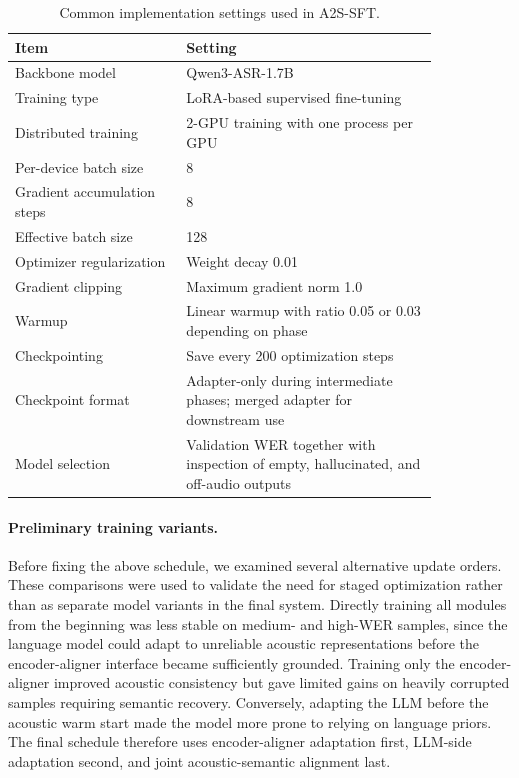 \documentclass{llmxive}
\providecommand{\arraystretch}{1.05}
\begin{document}
\begin{table}[t]
\centering
\small
\renewcommand{\arraystretch}{1.12}
\begin{tabular}{p{0.34\linewidth} p{0.50\linewidth}}
\toprule
\textbf{Item} & \textbf{Setting} \\
\midrule
Backbone model
& Qwen3-ASR-1.7B \\

Training type
& LoRA-based supervised fine-tuning \\

Distributed training
& 2-GPU training with one process per GPU \\

Per-device batch size
& 8 \\

Gradient accumulation steps
& 8 \\

Effective batch size
& 128 \\

Optimizer regularization
& Weight decay 0.01 \\

Gradient clipping
& Maximum gradient norm 1.0 \\

Warmup
& Linear warmup with ratio 0.05 or 0.03 depending on phase \\

Checkpointing
& Save every 200 optimization steps \\

Checkpoint format
& Adapter-only during intermediate phases; merged adapter for downstream use \\

Model selection
& Validation WER together with inspection of empty, hallucinated, and off-audio
outputs \\
\bottomrule
\end{tabular}
\vspace{-2mm}
\caption{
Common implementation settings used in A2S-SFT.
}
\label{tab:a2s_sft_common_settings}
\end{table}

\paragraph{Preliminary training variants.}
Before fixing the above schedule, we examined several alternative update orders.
These comparisons were used to validate the need for staged optimization rather
than as separate model variants in the final system. Directly training all modules
from the beginning was less stable on medium- and high-WER samples, since the
language model could adapt to unreliable acoustic representations before the
encoder-aligner interface became sufficiently grounded. Training only the
encoder-aligner improved acoustic consistency but gave limited gains on heavily
corrupted samples requiring semantic recovery. Conversely, adapting the LLM before
the acoustic warm start made the model more prone to relying on language priors.
The final schedule therefore uses encoder-aligner adaptation first, LLM-side
adaptation second, and joint acoustic-semantic alignment last.
\end{document}
